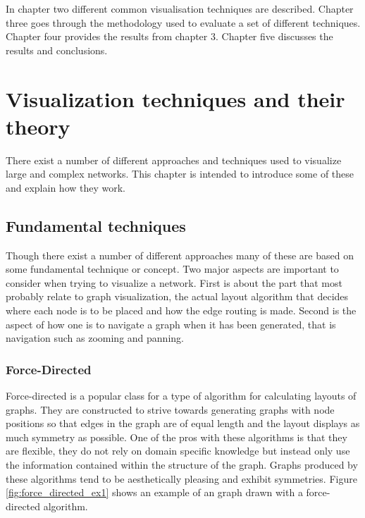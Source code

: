 \documentclass[a4paper,11pt]{kth-mag}
\begin{document}
In chapter two different common visualisation techniques are described. Chapter three goes through the methodology used to evaluate a set of different techniques. Chapter four provides the results from chapter 3. Chapter five discusses
the results and conclusions.
\chapter{Visualization techniques and their theory}
\label{Theory}
There exist a number of different approaches and techniques used to visualize large and complex networks. This chapter is intended to introduce some of these and explain how they work.
\section{Fundamental techniques}
Though there exist a number of different approaches many of these are based on some fundamental technique or concept. Two major aspects are important to consider when trying to visualize a network. First is about the part that
most probably relate to graph visualization, the actual layout algorithm that decides where each node is to be placed and how the edge routing is made. Second is the aspect of how one is to navigate a graph when it has been
generated, that is navigation such as zooming and panning.
\subsection{Force-Directed}
Force-directed is a popular class for a type of algorithm for calculating layouts of graphs. They are constructed to strive towards generating graphs with node positions so that edges in the graph are of equal length and the layout
displays as much symmetry as possible. One of the pros with these algorithms is that they are flexible, they do not rely on domain specific knowledge but instead only use the information contained within the structure of the graph. Graphs produced
by these algorithms tend to be aesthetically pleasing and exhibit symmetries\cite{1338}. Figure \ref{fig:force_directed_ex1} shows an example of an graph drawn with a force-directed algorithm.
\end{document}
